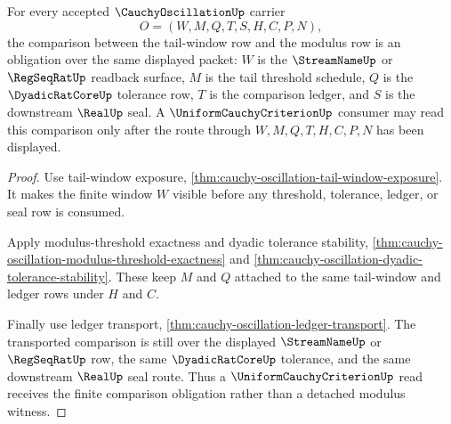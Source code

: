 \begin{theorem}
\label{thm:cauchy-oscillation-tail-modulus-comparison-obligation}
For every accepted $\CauchyOscillationUp$ carrier
$$
O=(W,M,Q,T,S,H,C,P,N),
$$
the comparison between the tail-window row and the modulus row is an obligation over the same displayed packet: $W$ is the $\StreamNameUp$ or $\RegSeqRatUp$ readback surface, $M$ is the tail threshold schedule, $Q$ is the $\DyadicRatCoreUp$ tolerance row, $T$ is the comparison ledger, and $S$ is the downstream $\RealUp$ seal. A $\UniformCauchyCriterionUp$ consumer may read this comparison only after the route through $W,M,Q,T,H,C,P,N$ has been displayed.
\end{theorem}
\begin{proof}
Use tail-window exposure, \autoref{thm:cauchy-oscillation-tail-window-exposure}. It makes the finite window $W$ visible before any threshold, tolerance, ledger, or seal row is consumed.

Apply modulus-threshold exactness and dyadic tolerance stability, \autoref{thm:cauchy-oscillation-modulus-threshold-exactness} and \autoref{thm:cauchy-oscillation-dyadic-tolerance-stability}. These keep $M$ and $Q$ attached to the same tail-window and ledger rows under $H$ and $C$.

Finally use ledger transport, \autoref{thm:cauchy-oscillation-ledger-transport}. The transported comparison is still over the displayed $\StreamNameUp$ or $\RegSeqRatUp$ row, the same $\DyadicRatCoreUp$ tolerance, and the same downstream $\RealUp$ seal route. Thus a $\UniformCauchyCriterionUp$ read receives the finite comparison obligation rather than a detached modulus witness.
\end{proof}

